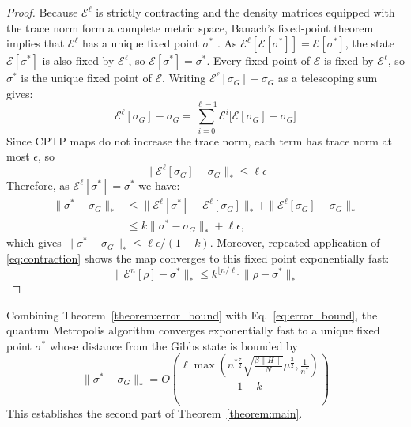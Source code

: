 \documentclass[aps,floatfix,10pt,amssymb,amsfont,amsmath,superscriptaddress,float,nofootinbib,longbibliography,nobalancelastpage,twocolumn]{revtex4-2}
\begin{document}
 \begin{proof}
Because $\mathcal{E}^{\ell}$ is strictly contracting and the density matrices equipped with the trace norm form a complete metric space, Banach's fixed-point theorem implies that $\mathcal{E}^{\ell}$ has a unique fixed point $\sigma^*$ \cite{Mart_nez_Pe_a_2023,Raginsky_2002}. As $\mathcal{E}^{\ell}[\mathcal{E}[\sigma^*]]=\mathcal{E}[\sigma^*]$, the state $\mathcal{E}[\sigma^*]$ is also fixed by $\mathcal{E}^{\ell}$, so $\mathcal{E}[\sigma^*]=\sigma^*$. Every fixed point of $\mathcal{E}$ is fixed by $\mathcal{E}^{\ell}$, so $\sigma^*$ is the unique fixed point of $\mathcal{E}$. Writing $\mathcal{E}^{\ell}[\sigma_G]-\sigma_G$ as a telescoping sum gives:
\begin{equation}
    \mathcal{E}^{\ell}[\sigma_G]-\sigma_G=\sum_{i=0}^{\ell-1}\mathcal{E}^{i}\big[\mathcal{E}[\sigma_G]-\sigma_G\big]
\end{equation}
Since CPTP maps do not increase the trace norm, each term has trace norm at most $\epsilon$, so
\begin{equation}
   \|\mathcal{E}^{\ell}[\sigma_G]-\sigma_G\|_*\leq\ell\epsilon
\end{equation}
Therefore, as $\mathcal{E}^{\ell}[\sigma^*]=\sigma^*$ we have:
\begin{align}
 \|\sigma^*-\sigma_G\|_*
 &\leq \|\mathcal{E}^{\ell}[\sigma^*]-\mathcal{E}^{\ell}[\sigma_G]\|_*+\|\mathcal{E}^{\ell}[\sigma_G]-\sigma_G\|_*\\
 &\leq k\|\sigma^*-\sigma_G\|_*+\ell\epsilon,
\end{align}
which gives $\|\sigma^*-\sigma_G\|_*\leq\ell\epsilon/(1-k)$. Moreover, repeated application of \eqref{eq:contraction} shows the map converges to this fixed point exponentially fast:
\begin{equation}
     \|\mathcal{E}^n[\rho] -\sigma^*\|_* \leq k^{\lfloor n/\ell\rfloor}\| \rho - \sigma^*\|_*
\end{equation}
 \end{proof}
 
Combining Theorem~\ref{theorem:error_bound} with Eq.~\eqref{eq:error_bound}, the quantum Metropolis algorithm converges exponentially fast to a unique fixed point $\sigma^*$ whose distance from the Gibbs state is bounded by
\begin{equation}
    \|\sigma^*-\sigma_G\|_* =
    O\left(\frac{\ell\max\left( n^{*\frac{7}{2}}\sqrt{\frac{\beta\|H\| }{N}}\mu^{\frac{3}{2}},\frac{1}{n^*}\right)}{1-k}\right)
\end{equation}
This establishes the second part of Theorem~\ref{theorem:main}.
 
\end{document}
